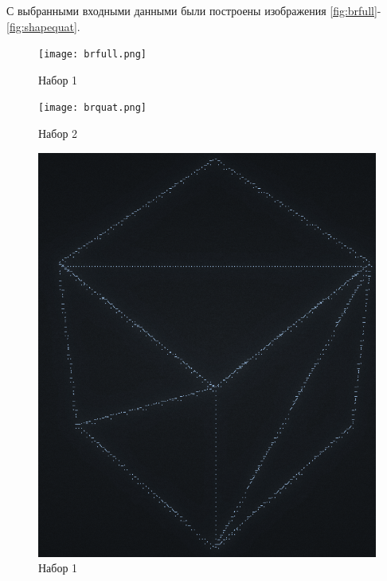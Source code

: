 С выбранными входными данными были построены изображения \ref{fig:brfull}-\ref{fig:shapequat}.

\begin{figure}[H]
    \centering
    \begin{minipage}{0.41\textwidth}
        \centering
        \texttt{[image: brfull.png]}
        \caption{Набор 1}
	\label{fig:brfull}
    \end{minipage}
    \begin{minipage}{0.36\textwidth}
        \centering
        \texttt{[image: brquat.png]}
        \caption{Набор 2}
	\label{fig:brquat}
    \end{minipage}
\end{figure}

\begin{figure}[H]
    \begin{minipage}{0.43\textwidth}
        \centering
        \includegraphics[width=\linewidth]{images/shapefull.png}
        \caption{Набор 1}
	\label{fig:shapefull}
    \end{minipage}
    \begin{minipage}{0.45\textwidth}

\end{minipage}
\end{figure}
